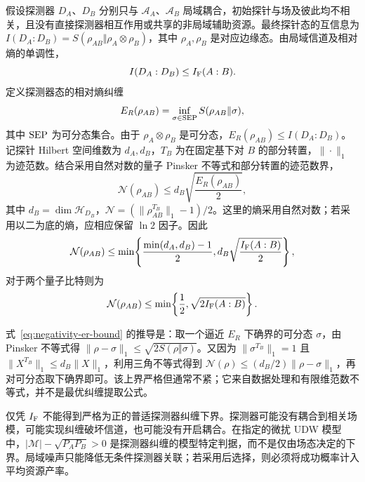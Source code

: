 \documentclass[UTF8,11pt,a4paper,fontset=none]{ctexart}
\begin{document}
假设探测器 $D_A$、$D_B$ 分别只与 $\mathcal A_A$、$\mathcal A_B$ 局域耦合，初始探针与场及彼此均不相关，且没有直接探测器相互作用或共享的非局域辅助资源。最终探针态的互信息为 $I(D_A:D_B)=S(\rho_{AB}\Vert\rho_A\otimes\rho_B)$，其中 $\rho_A,\rho_B$ 是对应边缘态。由局域信道及相对熵的单调性，
\begin{equation}
I(D_A:D_B)\leq I_{\rm F}(A:B).
\label{eq:detector-mutual-info-dpi}
\end{equation}
定义探测器态的相对熵纠缠
\begin{equation}
E_R(\rho_{AB})=\inf_{\sigma\in{\rm SEP}}S(\rho_{AB}\Vert\sigma),
\label{eq:relative-entropy-entanglement}
\end{equation}
其中 ${\rm SEP}$ 为可分态集合。由于 $\rho_A\otimes\rho_B$ 是可分态，$E_R(\rho_{AB})\leq I(D_A:D_B)$。记探针 Hilbert 空间维数为 $d_A,d_B$，$T_B$ 为在固定基下对 $B$ 的部分转置，$\|\cdot\|_1$ 为迹范数。结合采用自然对数的量子 Pinsker 不等式和部分转置的迹范数界，
\begin{equation}
\mathcal N(\rho_{AB})\leq d_B\sqrt{\frac{E_R(\rho_{AB})}{2}},
\label{eq:negativity-er-bound}
\end{equation}
其中 $d_B=\dim\mathcal H_{D_B}$，$\mathcal N=(\|\rho_{AB}^{T_B}\|_1-1)/2$。这里的熵采用自然对数；若采用以二为底的熵，应相应保留 $\ln 2$ 因子。因此
\begin{equation}
\mathcal N(\rho_{AB})\leq
\min\!\left\{\frac{\min(d_A,d_B)-1}{2},
d_B\sqrt{\frac{I_{\rm F}(A:B)}{2}}\right\},
\label{eq:field-to-detector-negativity-bound}
\end{equation}
对于两个量子比特则为
\begin{equation}
\mathcal N(\rho_{AB})\leq
\min\!\left\{\frac12,\sqrt{2I_{\rm F}(A:B)}\right\}.
\label{eq:two-qubit-field-negativity-bound}
\end{equation}

式~\eqref{eq:negativity-er-bound} 的推导是：取一个逼近 $E_R$ 下确界的可分态 $\sigma$，由 Pinsker 不等式得 $\|\rho-\sigma\|_1\leq\sqrt{2S(\rho\Vert\sigma)}$。又因为 $\|\sigma^{T_B}\|_1=1$ 且 $\|X^{T_B}\|_1\leq d_B\|X\|_1$，利用三角不等式得到 $\mathcal N(\rho)\leq(d_B/2)\|\rho-\sigma\|_1$，再对可分态取下确界即可。该上界严格但通常不紧；它来自数据处理和有限维范数不等式，并不是最优纠缠提取公式。

仅凭 $I_{\rm F}$ 不能得到严格为正的普适探测器纠缠下界。探测器可能没有耦合到相关场模，可能实现纠缠破坏信道，也可能没有开启耦合。在指定的微扰 UDW 模型中，$|\mathcal M|-\sqrt{P_AP_B}>0$ 是探测器纠缠的模型特定判据，而不是仅由场态决定的下界。局域噪声只能降低无条件探测器关联；若采用后选择，则必须将成功概率计入平均资源产率。
\end{document}
